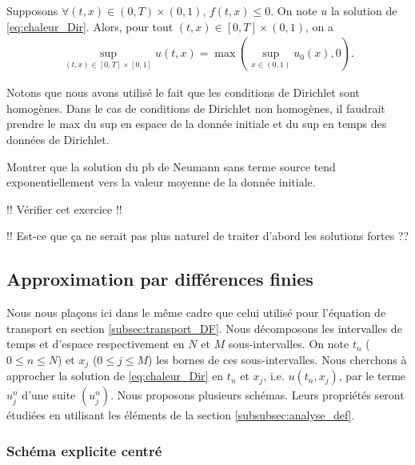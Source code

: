 \documentclass[12pt,a4paper,twoside]{article}
\begin{document}
\begin{proposition}
  Supposons $\forall (t,x) \in (0,T) \times (0,1)$,
  $f(t,x) \leq 0$. On note $u$ la solution de \eqref{eq:chaleur_Dir}.
  Alors, pour tout $(t,x) \in [0,T] \times (0,1)$, on a 
  \begin{align*}
    \sup_{(t,x) \in [0,T] \times [0,1]} u(t,x) = \max(\sup_{x \in (0,1)} u_0(x) , 0 ) .
  \end{align*}
\end{proposition}
Notons que nous avons utilis\'e le fait que les conditions de Dirichlet sont homog\`enes.
Dans le cas de conditions de Dirichlet non homog\`enes, il faudrait prendre le max
du sup en espace de la donn\'ee initiale et du sup en temps des donn\'ees de Dirichlet.



\begin{exercise}
  Montrer que la solution du pb de Neumann sans terme source
  tend exponentiellement vers la valeur moyenne de la donn\'ee initiale.
\end{exercise}

!! V\'erifier cet exercice !!


!! Est-ce que \c{c}a ne serait pas plus naturel de traiter d'abord les solutions fortes ??




\subsection{Approximation par diff\'erences finies}


Nous nous pla\c{c}ons ici dans le m\^eme cadre que celui utilis\'e pour 
l'\'equation de transport en section \ref{subsec:transport_DF}.
Nous d\'ecomposons les intervalles de temps et d'espace
respectivement en $N$ et $M$ sous-intervalles.
On note $t_n$ ($0 \leq n \leq N$) et $x_j$ ($0 \leq j \leq M$)
les bornes de ces sous-intervalles.
Nous cherchons \`a approcher la solution de \eqref{eq:chaleur_Dir}
en $t_n$ et $x_j$, i.e. $u(t_n,x_j)$, par le terme $u_j^n$ d'une suite
$(u_j^n)$. 
Nous proposons plusieurs sch\'emas.
Leurs propri\'et\'es seront \'etudi\'ees en utilisant les 
\'el\'ements de la section \ref{subsubsec:analyse_def}.


\subsubsection{Sch\'ema explicite centr\'e}
\end{document}
